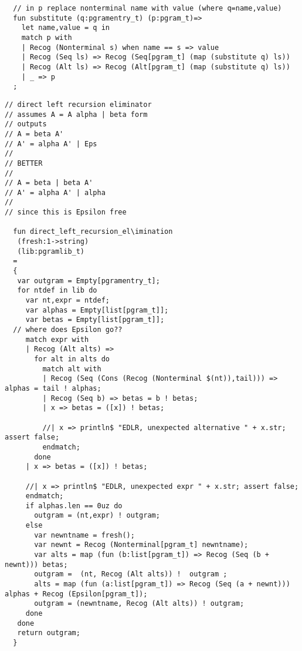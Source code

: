 \documentclass[oneside]{book}
\begin{document}
\begin{verbatim}
  // in p replace nonterminal name with value (where q=name,value)
  fun substitute (q:pgramentry_t) (p:pgram_t)=>
    let name,value = q in
    match p with
    | Recog (Nonterminal s) when name == s => value
    | Recog (Seq ls) => Recog (Seq[pgram_t] (map (substitute q) ls))
    | Recog (Alt ls) => Recog (Alt[pgram_t] (map (substitute q) ls))
    | _ => p
  ;
\end{verbatim}

\begin{verbatim}
// direct left recursion eliminator
// assumes A = A alpha | beta form
// outputs
// A = beta A'
// A' = alpha A' | Eps
//
// BETTER
//
// A = beta | beta A'
// A' = alpha A' | alpha
//
// since this is Epsilon free

  fun direct_left_recursion_el\imination 
   (fresh:1->string) 
   (lib:pgramlib_t) 
  =
  {
   var outgram = Empty[pgramentry_t];
   for ntdef in lib do
     var nt,expr = ntdef;
     var alphas = Empty[list[pgram_t]];
     var betas = Empty[list[pgram_t]];
  // where does Epsilon go??
     match expr with
     | Recog (Alt alts) =>
       for alt in alts do
         match alt with
         | Recog (Seq (Cons (Recog (Nonterminal $(nt)),tail))) => alphas = tail ! alphas;
         | Recog (Seq b) => betas = b ! betas;
         | x => betas = ([x]) ! betas;

         //| x => println$ "EDLR, unexpected alternative " + x.str; assert false;
         endmatch;
       done
     | x => betas = ([x]) ! betas;

     //| x => println$ "EDLR, unexpected expr " + x.str; assert false;
     endmatch;
     if alphas.len == 0uz do
       outgram = (nt,expr) ! outgram;
     else 
       var newntname = fresh();
       var newnt = Recog (Nonterminal[pgram_t] newntname); 
       var alts = map (fun (b:list[pgram_t]) => Recog (Seq (b + newnt))) betas;
       outgram =  (nt, Recog (Alt alts)) !  outgram ;
       alts = map (fun (a:list[pgram_t]) => Recog (Seq (a + newnt))) alphas + Recog (Epsilon[pgram_t]);
       outgram = (newntname, Recog (Alt alts)) ! outgram;
     done
   done
   return outgram;
  }
\end{verbatim}
\end{document}
